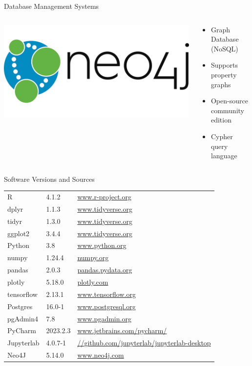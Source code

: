 \documentclass[ignorenonframetext,xcolor=dvipsnames]{beamer}
\begin{document}
\begin{frame}{Database Management Systems}
\begin{columns}
\begin{column}{.25\textwidth}
\includegraphics[width=\columnwidth]{neo4jlogo.png} 
\end{column}
\begin{column}{.75\textwidth}
\begin{itemize}
  \item Graph Database (NoSQL)
  \item Supports property graphs
  \item Open-source community edition
  \item Cypher query language
\end{itemize}
\end{column}
\end{columns}
\end{frame}

\begin{frame}{Software Versions and Sources}

\begin{table}
\small

\begin{tabular}{l|l|l} \hline
R & 4.1.2 & \url{www.r-project.org}\\ 
dplyr & 1.1.3 & \url{www.tidyverse.org} \\
tidyr & 1.3.0 & \url{www.tidyverse.org} \\
ggplot2 & 3.4.4 & \url{www.tidyverse.org} \\
Python & 3.8 & \url{www.python.org} \\
numpy & 1.24.4 & \url{numpy.org} \\
pandas & 2.0.3 & \url{pandas.pydata.org} \\
plotly & 5.18.0 & \url{plotly.com} \\ 
tensorflow & 2.13.1 & \url{www.tensorflow.org} \\
Postgres & 16.0-1 & \url{www.postgresql.org} \\
pgAdmin4 & 7.8 & \url{www.pgadmin.org} \\
PyCharm & 2023.2.3 & \url{www.jetbrains.com/pycharm/} \\
Jupyterlab & 4.0.7-1 & \url{//github.com/jupyterlab/jupyterlab-desktop} \\
Neo4J & 5.14.0 & \url{www.neo4j.com} \\ \hline
\end{tabular}
\end{table}
\end{frame}
\end{document}
